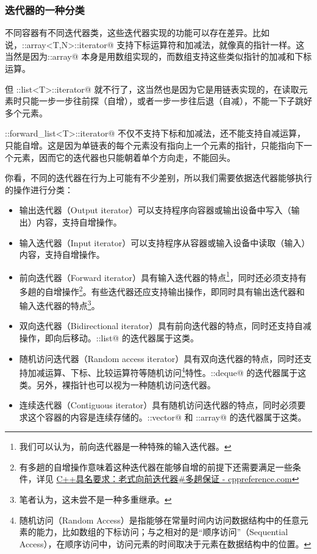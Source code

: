 \subsubsection*{迭代器的一种分类}
不同容器有不同迭代器类，这些迭代器实现的功能可以存在差异。比如说，\newline\lstinline@std::array<T,N>::iterator@ 支持下标运算符和加减法，就像真的指针一样。这当然是因为\newline\lstinline@std::array@ 本身是用数组实现的，而数组支持这些类似指针的加减和下标运算。\par
但 \lstinline@std::list<T>::iterator@ 就不行了，这当然也是因为它是用链表实现的，在读取元素时只能一步一步往前探（自增），或者一步一步往后退（自减），不能一下子跳好多个元素。\par
\lstinline@std::forward_list<T>::iterator@ 不仅不支持下标和加减法，还不能支持自减运算，只能自增。这是因为单链表的每个元素没有指向上一个元素的指针，只能指向下一个元素，因而它的迭代器也只能朝着单个方向走，不能回头。\par\pagebreak
你看，不同的迭代器在行为上可能有不少差别，所以我们需要依据迭代器能够执行的操作进行分类：
\begin{itemize}
    \item 输出迭代器（Output iterator）可以支持程序向容器或输出设备中写入（输出）内容，支持自增操作。
    \item 输入迭代器（Input iterator）可以支持程序从容器或输入设备中读取（输入）内容，支持自增操作。
    \item 前向迭代器（Forward iterator）具有输入迭代器的特点\footnote{我们可以认为，前向迭代器是一种特殊的输入迭代器。}，同时还必须支持有多趟的自增操作\footnote{有多趟的自增操作意味着这种迭代器在能够自增的前提下还需要满足一些条件，详见 \href{https://zh.cppreference.com/w/cpp/named_req/ForwardIterator\#.E5.A4.9A.E8.B6.9F.E4.BF.9D.E8.AF.81}{C++具名要求：老式向前迭代器\#多趟保证 - cppreference.com}}。有些迭代器还应支持输出操作，即同时具有输出迭代器和输入迭代器的特点\footnote{笔者认为，这未尝不是一种多重继承。}。
    \item 双向迭代器（Bidirectional iterator）具有前向迭代器的特点，同时还支持自减操作，即向后移动。\lstinline@std::list@ 的迭代器属于这类。
    \item 随机访问迭代器（Random access iterator）具有双向迭代器的特点，同时还支持加减运算、下标、比较运算符等随机访问\footnote{
        随机访问（Random Access）是指能够在常量时间内访问数据结构中的任意元素的能力，比如数组的下标访问；与之相对的是“顺序访问”（Sequential Access），在顺序访问中，访问元素的时间取决于元素在数据结构中的位置。}特性。\lstinline@std::deque@ 的迭代器属于这类。另外，裸指针也可以视为一种随机访问迭代器。
    \item 连续迭代器（Contiguous iterator）具有随机访问迭代器的特点，同时必须要求这个容器的内容是连续存储的。\lstinline@std::vector@ 和 \lstinline@std::array@ 的迭代器属于这类。
\end{itemize}
